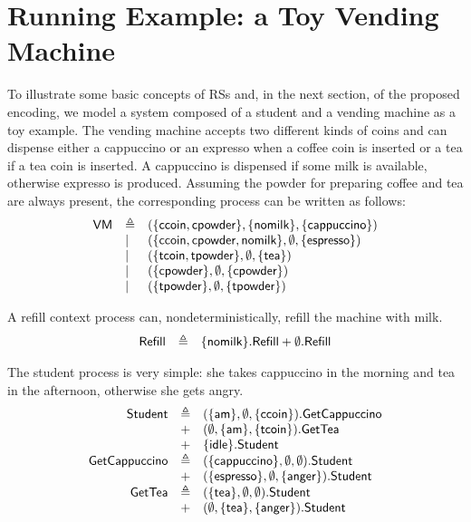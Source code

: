 
\section{Running Example: a Toy Vending Machine}\label{sec:student}

To illustrate some basic concepts of RSs and, in the next section, of the proposed encoding, we model a system composed of a student and a vending machine as a toy example.
The vending machine accepts two different kinds of coins and can dispense either a cappuccino or an expresso when a coffee coin is inserted or a tea if a tea coin is inserted. A cappuccino is dispensed if some milk is available, otherwise expresso is produced.
Assuming the powder for preparing coffee and tea are always present, the corresponding process can be written as follows:
\[
\begin{array}{lll}
\mathsf{VM} & \triangleq & (\{{\text{\sffamily ccoin}},{\text{\sffamily cpowder}}\},\{{\text{\sffamily nomilk}}\},\{{\text{\sffamily cappuccino}}\})\\
& | & (\{{\text{\sffamily ccoin}},{\text{\sffamily cpowder}},{\text{\sffamily nomilk}}\},\emptyset,\{{\text{\sffamily espresso}}\})\\
& | & (\{{\text{\sffamily tcoin}},{\text{\sffamily tpowder}}\},\emptyset,\{{\text{\sffamily tea}}\})\\
& | & (\{{\text{\sffamily cpowder}}\},\emptyset,\{{\text{\sffamily cpowder}}\})\\
& | & (\{{\text{\sffamily tpowder}}\},\emptyset,\{{\text{\sffamily tpowder}}\})\\
\end{array}
\]

A refill context process can, nondeterministically, refill the machine with milk.
\[
\begin{array}{lll}
\mathsf{Refill} & \triangleq & \{{\text{\sffamily nomilk}}\}.\mathsf{Refill}
+ \emptyset.\mathsf{Refill}
\end{array}
\]

The student process is very simple: she takes cappuccino in the morning and tea in the afternoon, otherwise she gets angry.
\[
\begin{array}{rll}
\mathsf{Student} & \triangleq & (\{{\text{\sffamily am}}\},\emptyset,\{{\text{\sffamily ccoin}}\}).\mathsf{GetCappuccino}\\
& + & (\emptyset,\{{\text{\sffamily am}}\},\{{\text{\sffamily tcoin}}\}).\mathsf{GetTea}\\
& + & \{{\text{\sffamily idle}}\}.\mathsf{Student}\\
\mathsf{GetCappuccino} & \triangleq & (\{{\text{\sffamily cappuccino}}\},\emptyset,\emptyset).\mathsf{Student}\\
& + & (\{{\text{\sffamily espresso}}\},\emptyset,\{{\text{\sffamily anger}}\}).\mathsf{Student}\\
\mathsf{GetTea} & \triangleq & (\{{\text{\sffamily tea}}\},\emptyset,\emptyset).\mathsf{Student}\\
& + & (\emptyset,\{{\text{\sffamily tea}}\},\{{\text{\sffamily anger}}\}).\mathsf{Student}\\
\end{array}
\]

